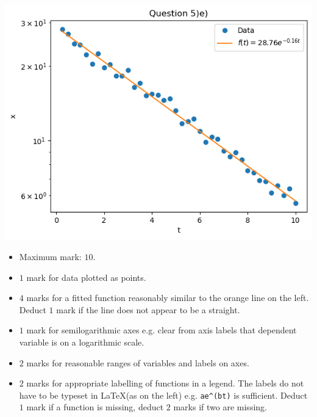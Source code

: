\documentclass[oneside,12pt]{article}
\begin{document}
	\begin{minipage}{0.49\textwidth}
		\includegraphics[scale=0.65]{q5e.png}
	\end{minipage}
	\begin{minipage}{0.49\textwidth}
		\begin{itemize}
			\item Maximum mark: \(10\).
			\item \(1\) mark for data plotted as points.
			\item \(4\) marks for a fitted function reasonably similar to the orange line on the left. Deduct \(1\) mark if the line does not appear to be a straight.
			\item \(1\) mark for semilogarithmic axes e.g. clear from axis labels that dependent variable is on a logarithmic scale.
			\item \(2\) marks for reasonable ranges of variables and labels on axes.
			\item \(2\) marks for appropriate labelling of functions in a legend. The labels do not have to be typeset in \LaTeX (as on the left) e.g. \verb|ae^(bt)| is sufficient. Deduct \(1\) mark if a function is missing, deduct \(2\) marks if two are missing.
		\end{itemize}
	\end{minipage}
	
	
	
	
	
\end{document}
